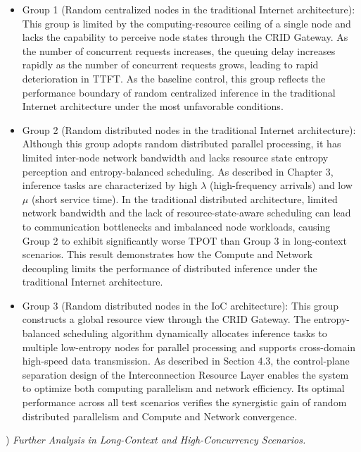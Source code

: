 \documentclass{ccjnl}
\begin{document}
\begin{itemize}[nosep]
	\item Group 1 (Random centralized nodes in the traditional Internet architecture): This group is limited by the computing-resource ceiling of a single node and lacks the capability to perceive node states through the CRID Gateway. As the number of concurrent requests increases, the queuing delay increases rapidly as the number of concurrent requests grows, leading to rapid deterioration in TTFT. As the baseline control, this group reflects the performance boundary of random centralized inference in the traditional Internet architecture under the most unfavorable conditions.
	
	\item Group 2 (Random distributed nodes in the traditional Internet architecture): Although this group adopts random distributed parallel processing, it has limited inter-node network bandwidth and lacks resource state entropy perception and entropy-balanced scheduling. As described in Chapter 3, inference tasks are characterized by high $\lambda$ (high-frequency arrivals) and low $\mu$ (short service time). In the traditional distributed architecture, limited network bandwidth and the lack of resource-state-aware scheduling can lead to communication bottlenecks and imbalanced node workloads, causing Group 2 to exhibit significantly worse TPOT than Group 3 in long-context scenarios. This result demonstrates how the Compute and Network decoupling limits the performance of distributed inference under the traditional Internet architecture.
	
	\item Group 3 (Random distributed nodes in the IoC architecture): This group constructs a global resource view through the CRID Gateway. The entropy-balanced scheduling algorithm dynamically allocates inference tasks to multiple low-entropy nodes for parallel processing and supports cross-domain high-speed data transmission. As described in Section 4.3, the control-plane separation design of the Interconnection Resource Layer enables the system to optimize both computing parallelism and network efficiency. Its optimal performance across all test scenarios verifies the synergistic gain of random distributed parallelism and Compute and Network convergence.
\end{itemize}

\par
{}
) \textit{Further Analysis in Long-Context and High-Concurrency Scenarios.}\par
\end{document}
